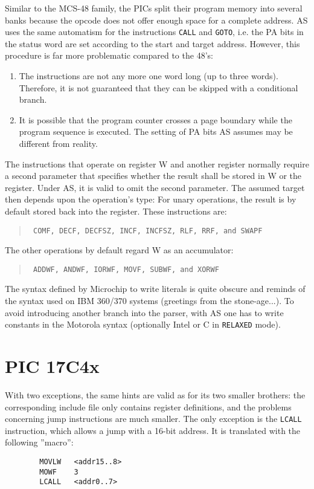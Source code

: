 \documentclass[12pt,twoside]{report}
\newcommand{\tty}[1]{{\tt #1}}
\begin{document}
Similar to the MCS-48 family, the PICs split their program memory
into several banks because the opcode does not offer enough space for
a complete address.  AS uses the same automatism for the instructions
\tty{CALL} and \tty{GOTO}, i.e. the PA bits in the status word are set according
to the start and target address.  However, this procedure is far more
problematic compared to the 48's:
\begin{enumerate}
\item{The instructions are not any more one word long (up to three
      words).  Therefore, it is not guaranteed that they can be 
      skipped with a conditional branch.}
\item{It is possible that the program counter crosses a page boundary
      while the program sequence is executed.  The setting of PA bits
      AS assumes may be different from reality.}
\end{enumerate}
The instructions that operate on register W and another register
normally require a second parameter that specifies whether the result
shall be stored in W or the register.  Under AS, it is valid to omit
the second parameter.  The assumed target then depends upon the
operation's type: For unary operations, the result is by default
stored back into the register.  These instructions are:
\begin{quote}{\tt
    COMF, DECF, DECFSZ, INCF, INCFSZ, RLF, RRF, and SWAPF
}\end{quote}
The other operations by default regard W as an accumulator:
\begin{quote}{\tt
    ADDWF, ANDWF, IORWF, MOVF, SUBWF, and XORWF
}\end{quote}
The syntax defined by Microchip to write literals is quite obscure
and reminds of the syntax used on IBM 360/370 systems (greetings from
the stone-age...).  To avoid introducing another branch into the
parser, with AS one has to write constants in the Motorola syntax
(optionally Intel or C in \tty{RELAXED} mode).


\section{PIC 17C4x}

With two exceptions, the same hints are valid as for its two smaller
brothers: the corresponding include file only contains register
definitions, and the problems concerning jump instructions are much
smaller.  The only exception is the \tty{LCALL} instruction, which allows a
jump with a 16-bit address.  It is translated with the following
''macro'':
\begin{verbatim}
        MOVLW   <addr15..8>   
        MOWF    3
        LCALL   <addr0..7>
\end{verbatim}
\end{document}
